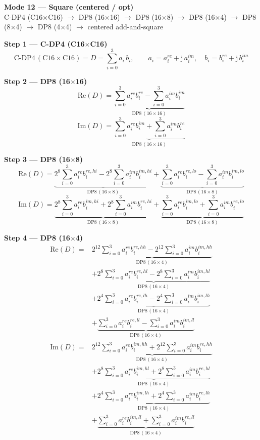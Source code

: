 \documentclass[fleqn]{article}
\newcommand{\DPop}[3]{\mathrm{DP#1}\,(#2\!\times\!#3)}
\begin{document}
\begin{center}
{\LARGE \textbf{Mode 12 --- Square (centered / opt)}}\\[4pt]
{\large C-DP4 (C16$\times$C16) $\rightarrow$ DP8 (16$\times$16) $\rightarrow$ DP8 (16$\times$8) $\rightarrow$ DP8 (16$\times$4) $\rightarrow$ DP8 (8$\times$4) $\rightarrow$ DP8 (4$\times$4) $\rightarrow$ centered add-and-square}
\end{center}

\vspace{0.1em}


\textbf{Step 1 --- C-DP4 (C16$\times$C16)}
\[
\text{C-DP4}\,(\mathrm{C16}\!\times\!\mathrm{C16}) = D = \sum_{i=0}^{3} a_i \, b_i, \qquad
a_i = a_i^{re} + \mathrm{j}\,a_i^{im}, \quad
b_i = b_i^{re} + \mathrm{j}\,b_i^{im}
\]

\textbf{Step 2 --- DP8 (16$\times$16)}
\[
\mathrm{Re}(D) = \underbrace{\sum_{i=0}^{3} a_i^{re} b_i^{re}
  - \sum_{i=0}^{3} a_i^{im} b_i^{im}}_{\DPop{8}{16}{16}}
\]
\[
\mathrm{Im}(D) = \underbrace{\sum_{i=0}^{3} a_i^{re} b_i^{im}
  + \sum_{i=0}^{3} a_i^{im} b_i^{re}}_{\DPop{8}{16}{16}}
\]

\textbf{Step 3 --- DP8 (16$\times$8)}
\[
\mathrm{Re}(D) = \underbrace{2^{8}\sum_{i=0}^{3} a_i^{re} b_i^{re,hi}
  - 2^{8}\sum_{i=0}^{3} a_i^{im} b_i^{im,hi}}_{\DPop{8}{16}{8}}
  + \underbrace{\sum_{i=0}^{3} a_i^{re} b_i^{re,lo}
  - \sum_{i=0}^{3} a_i^{im} b_i^{im,lo}}_{\DPop{8}{16}{8}}
\]
\[
\mathrm{Im}(D) = \underbrace{2^{8}\sum_{i=0}^{3} a_i^{re} b_i^{im,hi}
  + 2^{8}\sum_{i=0}^{3} a_i^{im} b_i^{re,hi}}_{\DPop{8}{16}{8}}
  + \underbrace{\sum_{i=0}^{3} a_i^{re} b_i^{im,lo}
  + \sum_{i=0}^{3} a_i^{im} b_i^{re,lo}}_{\DPop{8}{16}{8}}
\]

\textbf{Step 4 --- DP8 (16$\times$4)}
\begin{align*}
\mathrm{Re}(D) = {}
  & \underbrace{2^{12}\sum_{i=0}^{3} a_i^{re} b_i^{re,hh} - 2^{12}\sum_{i=0}^{3} a_i^{im} b_i^{im,hh}}_{\DPop{8}{16}{4}} \\[0.5em]
  & + \underbrace{2^{8}\sum_{i=0}^{3} a_i^{re} b_i^{re,hl} - 2^{8}\sum_{i=0}^{3} a_i^{im} b_i^{im,hl}}_{\DPop{8}{16}{4}} \\[0.5em]
  & + \underbrace{2^{4}\sum_{i=0}^{3} a_i^{re} b_i^{re,lh} - 2^{4}\sum_{i=0}^{3} a_i^{im} b_i^{im,lh}}_{\DPop{8}{16}{4}} \\[0.5em]
  & + \underbrace{\sum_{i=0}^{3} a_i^{re} b_i^{re,ll} - \sum_{i=0}^{3} a_i^{im} b_i^{im,ll}}_{\DPop{8}{16}{4}}
\end{align*}
\begin{align*}
\mathrm{Im}(D) = {}
  & \underbrace{2^{12}\sum_{i=0}^{3} a_i^{re} b_i^{im,hh} + 2^{12}\sum_{i=0}^{3} a_i^{im} b_i^{re,hh}}_{\DPop{8}{16}{4}} \\[0.5em]
  & + \underbrace{2^{8}\sum_{i=0}^{3} a_i^{re} b_i^{im,hl} + 2^{8}\sum_{i=0}^{3} a_i^{im} b_i^{re,hl}}_{\DPop{8}{16}{4}} \\[0.5em]
  & + \underbrace{2^{4}\sum_{i=0}^{3} a_i^{re} b_i^{im,lh} + 2^{4}\sum_{i=0}^{3} a_i^{im} b_i^{re,lh}}_{\DPop{8}{16}{4}} \\[0.5em]
  & + \underbrace{\sum_{i=0}^{3} a_i^{re} b_i^{im,ll} + \sum_{i=0}^{3} a_i^{im} b_i^{re,ll}}_{\DPop{8}{16}{4}}
\end{align*}
\end{document}

